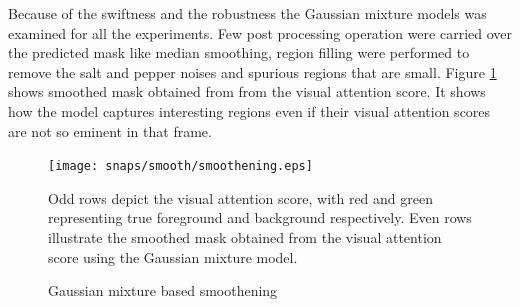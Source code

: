\par Because of the swiftness and the robustness the Gaussian mixture models was examined for all the experiments.  Few post processing operation were carried over the predicted mask like median smoothing, region filling were performed to remove the salt and pepper noises and spurious regions that are small.  Figure \ref{fig:smoothen} shows smoothed mask obtained from from the visual attention score.  It shows how the model captures interesting regions even if their visual attention scores are not so eminent in that frame.
\begin{figure}[!htpb]
   \begin{center}
	    \texttt{[image: snaps/smooth/smoothening.eps]}     
     \caption {Gaussian mixture based smoothening}
 	\medskip 
 	\small Odd rows depict the visual attention score, with red and green representing true foreground and background respectively.  Even rows illustrate the smoothed mask obtained from the visual attention score using the Gaussian mixture model. 
   \label{fig:smoothen}
   \end{center}
 \end{figure}
 

